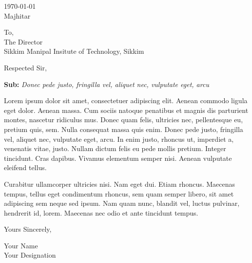 \documentclass[a4paper, 12pt]{letter}
\begin{document}
\pagestyle{empty}

\begin{flushright}
	 \today \\
	 Majhitar
\end{flushright}

\begin{flushleft}
	To, \\
	\hspace{1cm} The Director\\
	\hspace{1cm}  Sikkim Manipal Insitute of Technology, Sikkim
\end{flushleft}

Respected Sir, 

\textbf{Sub: } \emph{Donec pede justo, fringilla vel, aliquet nec, vulputate eget, arcu}

Lorem ipsum dolor sit amet, consectetuer adipiscing elit. Aenean commodo ligula eget dolor. Aenean massa. Cum sociis natoque penatibus et magnis dis parturient montes, nascetur ridiculus mus. Donec quam felis, ultricies nec, pellentesque eu, pretium quis, sem. Nulla consequat massa quis enim. Donec pede justo, fringilla vel, aliquet nec, vulputate eget, arcu. In enim justo, rhoncus ut, imperdiet a, venenatis vitae, justo. Nullam dictum felis eu pede mollis pretium. Integer tincidunt. Cras dapibus. Vivamus elementum semper nisi. Aenean vulputate eleifend tellus. 

Curabitur ullamcorper ultricies nisi. Nam eget dui. Etiam rhoncus. Maecenas tempus, tellus eget condimentum rhoncus, sem quam semper libero, sit amet adipiscing sem neque sed ipsum. Nam quam nunc, blandit vel, luctus pulvinar, hendrerit id, lorem. Maecenas nec odio et ante tincidunt tempus.

Yours Sincerely, 
\medskip

Your Name\\
Your Designation
\end{document}
